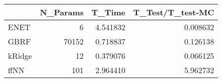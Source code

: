 \begin{tabular}{lrrr}
\toprule
{} &  N\_Params &    T\_Time &  T\_Test/T\_test-MC \\
\midrule
ENET   &         6 &  4.541832 &          0.008632 \\
GBRF   &     70152 &  0.718837 &          0.126138 \\
kRidge &        12 &  0.379076 &          0.066125 \\
ffNN   &       101 &  2.964410 &          5.962732 \\
\bottomrule
\end{tabular}
